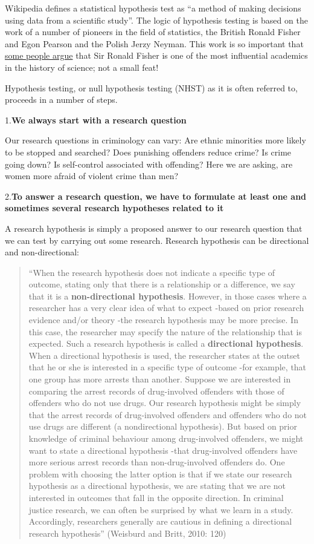 \documentclass[
]{book}
\begin{document}
Wikipedia defines a statistical hypothesis test as ``a method of making decisions using data from a scientific study''. The logic of hypothesis testing is based on the work of a number of pioneers in the field of statistics, the British Ronald Fisher and Egon Pearson and the Polish Jerzy Neyman. This work is so important that \href{https://simplystatistics.tumblr.com/post/18903448428/ra-fisher-is-the-most-influential-scientist-ever}{some people argue} that Sir Ronald Fisher is one of the most influential academics in the history of science; not a small feat!

Hypothesis testing, or null hypothesis testing (NHST) as it is often referred to, proceeds in a number of steps.

1.\textbf{We always start with a research question}

Our research questions in criminology can vary: Are ethnic minorities more likely to be stopped and searched? Does punishing offenders reduce crime? Is crime going down? Is self-control associated with offending? Here we are asking, are women more afraid of violent crime than men?

2.\textbf{To answer a research question, we have to formulate at least one and sometimes several research hypotheses related to it}

A research hypothesis is simply a proposed answer to our research question that we can test by carrying out some research. Research hypothesis can be directional and non-directional:

\begin{quote}
``When the research hypothesis does not indicate a specific type of outcome, stating only that there is a relationship or a difference, we say that it is a \textbf{non-directional hypothesis}. However, in those cases where a researcher has a very clear idea of what to expect -based on prior research evidence and/or theory -the research hypothesis may be more precise. In this case, the researcher may specify the nature of the relationship that is expected. Such a research hypothesis is called a \textbf{directional hypothesis}. When a directional hypothesis is used, the researcher states at the outset that he or she is interested in a specific type of outcome -for example, that one group has more arrests than another. Suppose we are interested in comparing the arrest records of drug-involved offenders with those of offenders who do not use drugs. Our research hypothesis might be simply that the arrest records of drug-involved offenders and offenders who do not use drugs are different (a nondirectional hypothesis). But based on prior knowledge of criminal behaviour among drug-involved offenders, we might want to state a directional hypothesis -that drug-involved offenders have more serious arrest records than non-drug-involved offenders do. One problem with choosing the latter option is that if we state our research hypothesis as a directional hypothesis, we are stating that we are not interested in outcomes that fall in the opposite direction. In criminal justice research, we can often be surprised by what we learn in a study. Accordingly, researchers generally are cautious in defining a directional research hypothesis'' (Weisburd and Britt, 2010: 120)
\end{quote}
\end{document}
